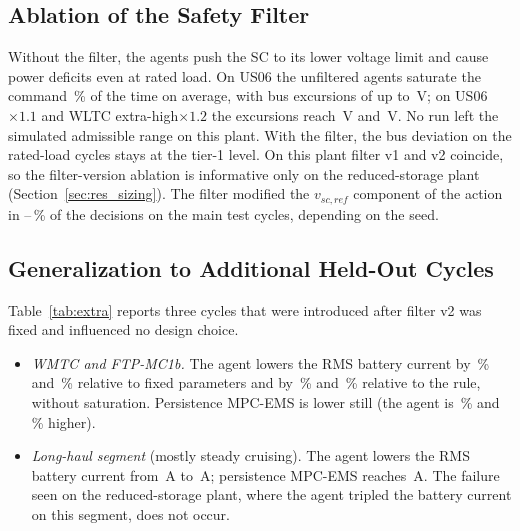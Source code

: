 \subsection{Ablation of the Safety Filter}\label{sec:res_filter}
Without the filter, the agents push the SC to its lower voltage limit and cause power deficits even at rated load. On US06 the unfiltered agents saturate the command \,\% of the time on average, with bus excursions of up to \,V; on US06$\times1.1$ and WLTC extra-high$\times1.2$ the excursions reach \,V and \,V. No run left the simulated admissible range on this plant. With the filter, the bus deviation on the rated-load cycles stays at the tier-1 level. On this plant filter v1 and v2 coincide, so the filter-version ablation is informative only on the reduced-storage plant (Section~\ref{sec:res_sizing}). The filter modified the $v_{sc,ref}$ component of the action in \FiltVscMin--\FiltVscMax\,\% of the decisions on the main test cycles, depending on the seed.

\subsection{Generalization to Additional Held-Out Cycles}\label{sec:res_extra}


Table~\ref{tab:extra} reports three cycles that were introduced after filter v2 was fixed and influenced no design choice.
\begin{itemize}
\item \emph{WMTC and FTP-MC1b.} The agent lowers the RMS battery current by \,\% and \,\% relative to fixed parameters and by \,\% and \,\% relative to the rule, without saturation. Persistence MPC-EMS is lower still (the agent is \,\% and \,\% higher).
\item \emph{Long-haul segment} (mostly steady cruising). The agent lowers the RMS battery current from \,A to \,A; persistence MPC-EMS reaches \,A. The failure seen on the reduced-storage plant, where the agent tripled the battery current on this segment, does not occur.
\end{itemize}

